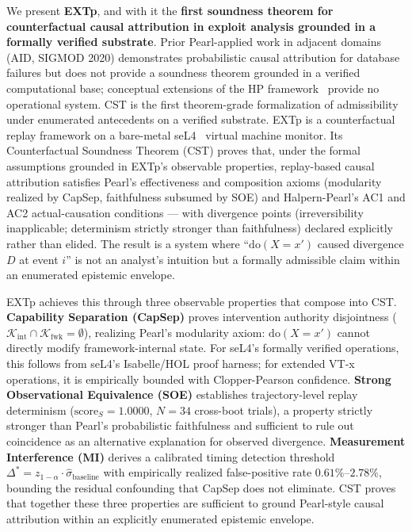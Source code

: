 \documentclass[conference]{IEEEtran}
\newcommand{\Kint}{\mathcal{K}_\text{int}}
\newcommand{\Kfwk}{\mathcal{K}_\text{fwk}}
\newcommand{\sigbase}{\hat{\sigma}_\text{baseline}}
\newcommand{\Dstar}{\Delta^{*}}
\newcommand{\scoreS}{\text{score}_S}
\newcommand{\dox}[1]{\text{do}(X{=}#1)}
\begin{document}
We present \textbf{EXTp}, and with it the \textbf{first soundness
theorem for counterfactual causal attribution in exploit analysis
grounded in a formally verified substrate}. Prior Pearl-applied
work in adjacent domains~\cite{fariha2020aid} (AID, SIGMOD 2020)
demonstrates probabilistic causal attribution for database failures
but does not provide a soundness theorem grounded in a verified
computational base; conceptual extensions of the HP
framework~\cite{soloviev2021nested} provide no operational system.
CST is the first theorem-grade formalization of admissibility
under enumerated antecedents on a verified substrate. EXTp is a
counterfactual replay framework on a bare-metal
seL4~\cite{klein2009sel4} virtual machine monitor. Its Counterfactual
Soundness Theorem (CST) proves that, under the formal assumptions
grounded in EXTp's observable properties, replay-based causal
attribution satisfies Pearl's effectiveness and composition axioms
(modularity realized by CapSep, faithfulness subsumed by SOE) and
Halpern-Pearl's AC1 and AC2 actual-causation conditions --- with
divergence points (irreversibility inapplicable; determinism strictly
stronger than faithfulness) declared explicitly rather than elided.
The result is a system where ``$\dox{x'}$ caused divergence $D$ at
event $i$'' is not an analyst's intuition but a formally admissible
claim within an enumerated epistemic envelope.

EXTp achieves this through three observable properties that compose
into CST. \textbf{Capability Separation (CapSep)} proves intervention
authority disjointness ($\Kint \cap \Kfwk = \emptyset$), realizing
Pearl's modularity axiom: $\dox{x'}$ cannot directly modify
framework-internal state. For seL4's formally verified operations,
this follows from seL4's Isabelle/HOL proof harness; for extended
VT-x operations, it is empirically bounded with Clopper-Pearson
confidence. \textbf{Strong Observational Equivalence (SOE)}
establishes trajectory-level replay determinism
($\scoreS = 1.0000$, $N{=}34$ cross-boot trials), a property strictly
stronger than Pearl's probabilistic faithfulness and sufficient to
rule out coincidence as an alternative explanation for observed
divergence. \textbf{Measurement Interference (MI)} derives a
calibrated timing detection threshold $\Dstar = z_{1-\alpha} \cdot
\sigbase$ with empirically realized false-positive rate
$0.61\%$--$2.78\%$, bounding the residual confounding that CapSep
does not eliminate. CST proves that together these three properties
are sufficient to ground Pearl-style causal attribution within an
explicitly enumerated epistemic envelope.
\end{document}
